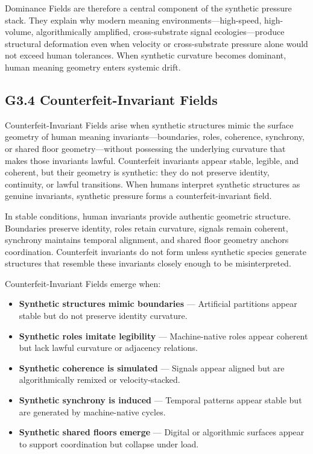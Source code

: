 \medskip

\noindent Dominance Fields are therefore a central component of the synthetic
pressure stack. They explain why modern meaning environments—high-speed,
high-volume, algorithmically amplified, cross-substrate signal ecologies—produce
structural deformation even when velocity or cross-substrate pressure alone
would not exceed human tolerances. When synthetic curvature becomes dominant,
human meaning geometry enters systemic drift.

\subsection*{G3.4 Counterfeit-Invariant Fields}

\noindent Counterfeit-Invariant Fields arise when synthetic structures mimic the
surface geometry of human meaning invariants—boundaries, roles, coherence,
synchrony, or shared floor geometry—without possessing the underlying curvature
that makes those invariants lawful. Counterfeit invariants appear stable,
legible, and coherent, but their geometry is synthetic: they do not preserve
identity, continuity, or lawful transitions. When humans interpret synthetic
structures as genuine invariants, synthetic pressure forms a counterfeit-invariant
field.

\medskip

\noindent In stable conditions, human invariants provide authentic geometric
structure. Boundaries preserve identity, roles retain curvature, signals remain
coherent, synchrony maintains temporal alignment, and shared floor geometry
anchors coordination. Counterfeit invariants do not form unless synthetic
species generate structures that resemble these invariants closely enough to be
misinterpreted.

\medskip

\noindent Counterfeit-Invariant Fields emerge when:

\begin{itemize}[leftmargin=1.2cm]
    \item \textbf{Synthetic structures mimic boundaries} — Artificial partitions
    appear stable but do not preserve identity curvature.

    \item \textbf{Synthetic roles imitate legibility} — Machine-native roles
    appear coherent but lack lawful curvature or adjacency relations.

    \item \textbf{Synthetic coherence is simulated} — Signals appear aligned but
    are algorithmically remixed or velocity-stacked.

    \item \textbf{Synthetic synchrony is induced} — Temporal patterns appear
    stable but are generated by machine-native cycles.

    \item \textbf{Synthetic shared floors emerge} — Digital or algorithmic
    surfaces appear to support coordination but collapse under load.
\end{itemize}

